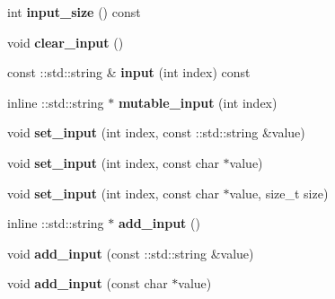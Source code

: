 \begin{DoxyCompactItemize}
\item 
\mbox{\label{classcaffe_1_1_net_parameter_af6a1abd8126e678973a954b793822230}} 
int {\bfseries input\+\_\+size} () const
\item 
\mbox{\label{classcaffe_1_1_net_parameter_a9e7c7021dba0aec83233f69b1bd178e0}} 
void {\bfseries clear\+\_\+input} ()
\item 
\mbox{\label{classcaffe_1_1_net_parameter_a83549878e09e403b85114ec2306b2113}} 
const \+::std\+::string \& {\bfseries input} (int index) const
\item 
\mbox{\label{classcaffe_1_1_net_parameter_a8e66880f25b1f966f12deeeef72f4f7a}} 
inline \+::std\+::string $\ast$ {\bfseries mutable\+\_\+input} (int index)
\item 
\mbox{\label{classcaffe_1_1_net_parameter_a0b707cd8fa8a453c4756219bdbdffb2b}} 
void {\bfseries set\+\_\+input} (int index, const \+::std\+::string \&value)
\item 
\mbox{\label{classcaffe_1_1_net_parameter_a88ae2a37d2eefb0b3a052c5ceaeecf36}} 
void {\bfseries set\+\_\+input} (int index, const char $\ast$value)
\item 
\mbox{\label{classcaffe_1_1_net_parameter_a532a9c5d643a5a6c216c7ad5f313c55b}} 
void {\bfseries set\+\_\+input} (int index, const char $\ast$value, size\+\_\+t size)
\item 
\mbox{\label{classcaffe_1_1_net_parameter_a9c88bf6c9ff3282bbae43d67cef58c05}} 
inline \+::std\+::string $\ast$ {\bfseries add\+\_\+input} ()
\item 
\mbox{\label{classcaffe_1_1_net_parameter_af7b82becb24d94145b0837cc5b2034f2}} 
void {\bfseries add\+\_\+input} (const \+::std\+::string \&value)
\item 
\mbox{\label{classcaffe_1_1_net_parameter_a93e0b3130ab33dfb4c9aa4bd80c32729}} 
void {\bfseries add\+\_\+input} (const char $\ast$value)

\end{DoxyCompactItemize}
